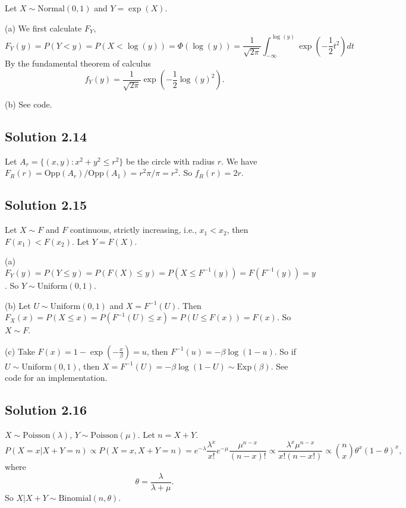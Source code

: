 Let $X \sim \mathrm{Normal}(0, 1)$ and $Y = \exp(X)$.

(a) We first calculate $F_Y$,
\begin{equation*}
F_Y(y) = P(Y < y)
    = P(X < \log(y))
    = \Phi(\log(y))
    = \frac{1}{\sqrt{2\pi}} \int_{-\infty}^{\log(y)} \exp\left(-\frac{1}{2} t^2\right) dt
\end{equation*}
By the fundamental theorem of calculus
$$
f_Y(y) = \frac{1}{\sqrt{2\pi}} \exp\left(-\frac{1}{2} \log(y)^2\right).
$$

(b) See code.


\subsection*{Solution 2.14}

Let $A_r = \{(x, y) : x^2 + y^2 \leq r^2\}$ be the circle with radius $r$.
We have $F_R(r) = \mathrm{Opp}(A_r) / \mathrm{Opp}(A_1) = r^2 \pi / \pi = r^2$.
So $f_R(r) = 2r$.


\subsection*{Solution 2.15}

Let $X \sim F$ and $F$ continuous, strictly increasing, i.e., $x_1 < x_2$, then $F(x_1) < F(x_2)$.
Let $Y = F(X)$.

(a) $F_Y(y) = P(Y \leq y) = P(F(X) \leq y) = P(X \leq F^{-1}(y)) = F(F^{-1}(y)) = y$.
So $Y \sim \mathrm{Uniform}(0, 1)$.

(b) Let $U \sim \mathrm{Uniform}(0, 1)$ and $X = F^{-1}(U)$.
Then $F_X(x) = P(X \leq x) = P(F^{-1}(U) \leq x) = P(U \leq F(x)) = F(x)$.
So $X \sim F$.

(c) Take $F(x) = 1 - \exp(-\frac{x}{\beta}) = u$, then $F^{-1}(u) = -\beta \log(1 - u)$.
So if $U \sim \mathrm{Uniform}(0, 1)$, then $X = F^{-1}(U) = -\beta \log(1 - U) \sim \mathrm{Exp}(\beta)$.
See code for an implementation.


\subsection*{Solution 2.16}

$X \sim \mathrm{Poisson}(\lambda)$, $Y \sim \mathrm{Poisson}(\mu)$.
Let $n = X + Y$.
\begin{equation*}
    P(X = x | X + Y = n) \propto P(X = x, X + Y = n)
        = e^{-\lambda} \frac{\lambda^x}{x!} e^{-\mu} \frac{\mu^{n-x}}{(n - x)!}
        \propto \frac{\lambda^x \mu^{n-x}}{x!(n-x!)}
        \propto \binom{n}{x} \theta^x (1 - \theta)^x,
\end{equation*}
where
\begin{equation*}
    \theta = \frac{\lambda}{\lambda + \mu}.
\end{equation*}
So $X|X+Y \sim \mathrm{Binomial}(n, \theta)$.


